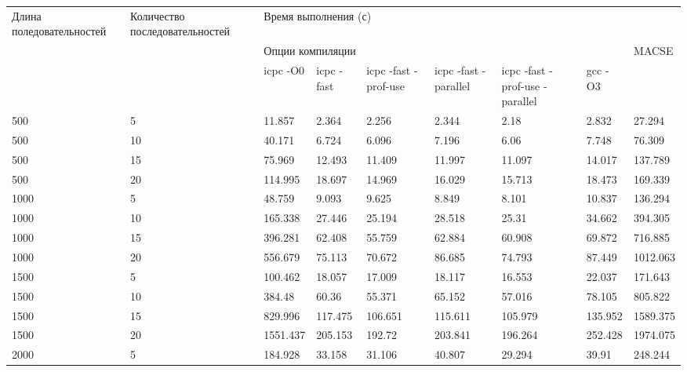 \begin{landscape}
\begin{table}[htbp]
\caption{Результаты тестирования}
\begin{longtable}{|*{2}{p{3.5cm}|}*{2}{p{1.8cm}|}*{3}{p{2.8cm}|}*{2}{p{1.8cm}|}}
\hline
\multicolumn{ 1}{|p{3.5cm}|}{Длина поледовательностей} & \multicolumn{ 1}{p{3.5cm}|}{Количество последовательностей} & \multicolumn{ 7}{p{15.6cm}|}{Время выполнения (с)} \\ \cline{ 3- 9}
\multicolumn{ 1}{|p{3.5cm}|}{} & \multicolumn{ 1}{p{3.5cm}|}{} & \multicolumn{ 6}{p{10.8cm}|}{Опции компиляции } & \multicolumn{ 1}{p{1.8cm}|}{MACSE} \\ \cline{ 3- 8}
\multicolumn{ 1}{|p{3.5cm}|}{} & \multicolumn{ 1}{p{3.5cm}|}{} & \multicolumn{1}{p{1.8cm}|}{icpc -O0} & \multicolumn{1}{p{1.8cm}|}{icpc -fast} & \multicolumn{1}{p{1.8cm}|}{icpc  -fast -prof-use} & \multicolumn{1}{p{1.8cm}|}{icpc -fast -parallel} & \multicolumn{1}{p{1.8cm}|}{icpc -fast -prof-use -parallel} & \multicolumn{1}{p{1.8cm}|}{gcc -O3} & \multicolumn{ 1}{p{1.8cm}|}{} \\ \hline
500 & 5 & 11.857 & 2.364 & 2.256 & 2.344 & 2.18 & 2.832 & 27.294 \\ \hline
500 & 10 & 40.171 & 6.724 & 6.096 & 7.196 & 6.06 & 7.748 & 76.309 \\ \hline
500 & 15 & 75.969 & 12.493 & 11.409 & 11.997 & 11.097 & 14.017 & 137.789 \\ \hline
500 & 20 & 114.995 & 18.697 & 14.969 & 16.029 & 15.713 & 18.473 & 169.339 \\ \hline
1000 & 5 & 48.759 & 9.093 & 9.625 & 8.849 & 8.101 & 10.837 & 136.294 \\ \hline
1000 & 10 & 165.338 & 27.446 & 25.194 & 28.518 & 25.31 & 34.662 & 394.305 \\ \hline
1000 & 15 & 396.281 & 62.408 & 55.759 & 62.884 & 60.908 & 69.872 & 716.885 \\ \hline
1000 & 20 & 556.679 & 75.113 & 70.672 & 86.685 & 74.793 & 87.449 & 1012.063 \\ \hline
1500 & 5 & 100.462 & 18.057 & 17.009 & 18.117 & 16.553 & 22.037 & 171.643 \\ \hline
1500 & 10 & 384.48 & 60.36 & 55.371 & 65.152 & 57.016 & 78.105 & 805.822 \\ \hline
1500 & 15 & 829.996 & 117.475 & 106.651 & 115.611 & 105.979 & 135.952 & 1589.375 \\ \hline
1500 & 20 & 1551.437 & 205.153 & 192.72 & 203.841 & 196.264 & 252.428 & 1974.075 \\ \hline
2000 & 5 & 184.928 & 33.158 & 31.106 & 40.807 & 29.294 & 39.91 & 248.244 \\ \hline
\end{longtable}
\label{tabular:results}
\end{table}
\end{landscape}

